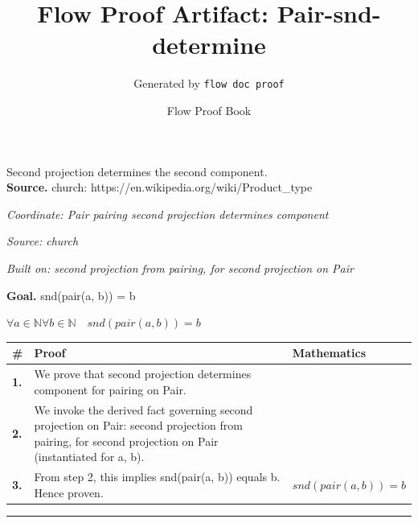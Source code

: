 \documentclass[11pt]{article}
\title{Flow Proof Artifact: Pair-snd-determine}
\author{Generated by \texttt{flow doc proof}}
\date{Flow Proof Book}
\theoremstyle{definition}
\begin{document}
\maketitle
Second projection determines the second component.\\[0.5em]
\textbf{Source.} church: https://en.wikipedia.org/wiki/Product\_type\\[0.5em]
\bigskip
{}\par
\smallskip\noindent\textit{Coordinate: Pair \cdot pairing \cdot second projection determines component}\par
\smallskip\noindent\textit{Source: church}\par
\smallskip\noindent\textit{Built on: second projection from pairing, for second projection on Pair}\par
\medskip
\noindent\textbf{Goal.} snd(pair(a, b)) = b\par
\noindent$\displaystyle \forall a \in \mathbb{N} \forall b \in \mathbb{N}\quad snd(pair(a, b)) = b$\par
\medskip
\noindent
\begin{tabular}{@{} >{\raggedright\arraybackslash}p{} >{\raggedright\arraybackslash}p{} >{\raggedleft\arraybackslash}p{} @{}}
\textbf{\#} & \textbf{Proof} & \textbf{Mathematics} \\
\midrule
\textbf{1.} & We prove that second projection determines component for pairing on Pair. & \\[0.45em]
\textbf{2.} & We invoke the derived fact governing second projection on Pair: second projection from pairing, for second projection on Pair (instantiated for a, b). & \\[0.45em]
\textbf{3.} & From step 2, this implies snd(pair(a, b)) equals b. Hence proven. & $\displaystyle snd(pair(a, b)) = b$ \\[0.45em]
\bottomrule
\end{tabular}
\label{thm:Pair-pairing-second_projection_determines_component}
\par\medskip\hrule
\end{document}
